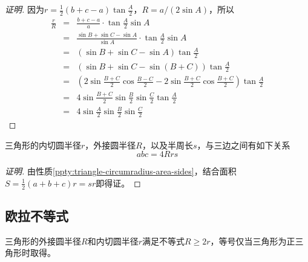 \begin{proof}[证明]
  因为$r=\frac{1}{2}(b+c-a)\tan{\frac{A}{2}}$，$R=a/(2\sin{A})$，所以
  \begin{eqnarray*}
    \frac{r}{R} & = & \frac{b+c-a}{a} \cdot \tan{\frac{A}{2}}\sin{A}\\
                & = & \frac{\sin{B} + \sin{C} - \sin{A}}{\sin{A}} \cdot \tan{\frac{A}{2}}\sin{A} \\
                & = & (\sin{B} + \sin{C} - \sin{A}) \tan{\frac{A}{2}} \\
                & = & (\sin{B} + \sin{C} - \sin{(B+C)}) \tan{\frac{A}{2}} \\
                & = & \left( 2\sin{\frac{B+C}{2}}\cos{\frac{B-C}{2}}-2\sin{\frac{B+C}{2}}\cos{\frac{B+C}{2}} \right) \tan{\frac{A}{2}} \\
                & = & 4\sin{\frac{B+C}{2}}\sin{\frac{B}{2}}\sin{\frac{C}{2}}\tan{\frac{A}{2}} \\
    & = & 4 \sin{\frac{A}{2}}\sin{\frac{B}{2}}\sin{\frac{C}{2}}
  \end{eqnarray*}
\end{proof}

\begin{property}
  三角形的内切圆半径$r$，外接圆半径$R$，以及半周长$s$，与三边之间有如下关系
  \begin{equation}
    \label{eq:triangle-abc-equal-4Rrs}
    abc = 4Rrs
  \end{equation}
\end{property}

\begin{proof}[证明]
 由性质\ref{ppty:triangle-circumradius-area-sides}，结合面积$S=\frac{1}{2}(a+b+c)r=sr$即得证。
\end{proof}

\subsection{欧拉不等式}
\label{sec:euler-inequality}

\begin{theorem}
  三角形的外接圆半径$R$和内切圆半径$r$满足不等式$R \geqslant 2r$，等号仅当三角形为正三角形时取得。
\end{theorem}

